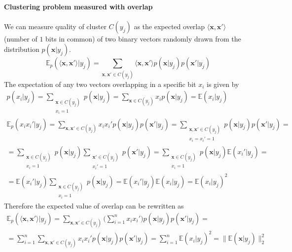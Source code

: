 \documentclass[12pt]{article}
\begin{document}
\paragraph{Clustering problem measured with overlap}
We can measure quality of cluster $C(y_j)$ as the expected overlap $\langle \boldsymbol{x}, \boldsymbol{x}'\rangle$ (number of $1$ bits in common) of two binary vectors  randomly drawn from the distribution $p(\boldsymbol{x}|y_j)$.
\[
\mathbb{E}_p(\langle \boldsymbol{x}, \boldsymbol{x}'\rangle|y_j) = \sum_{\boldsymbol{x},\boldsymbol{x}'\in C(y_j)} \langle \boldsymbol{x}, \boldsymbol{x}'\rangle p(\boldsymbol{x}|y_j)p(\boldsymbol{x}'|y_j)
\]
The expectation of any two vectors overlapping in a specific bit $x_i$ is given by
\begin{gather*}
p(x_i|y_j) = \sum_{\substack{\boldsymbol{x}\in C(y_j)\\x_i=1}} p(\boldsymbol{x}|y_j)	= \sum_{\boldsymbol{x}\in C(y_j)} x_i p(\boldsymbol{x}|y_j)	= \mathbb{E}(x_i|y_j)\\
\mathbb{E}_p(x_i x_i' | y_j) = \sum_{\boldsymbol{x},\boldsymbol{x}'\in C(y_j)}  x_i x_i' p(\boldsymbol{x}|y_j)p(\boldsymbol{x}'|y_j) = 	\sum_{\substack{\boldsymbol{x},\boldsymbol{x}'\in C(y_j) \\ x_i=x_i'=1}} p(\boldsymbol{x}|y_j)p(\boldsymbol{x}'|y_j) = \\
= \sum_{\substack{\boldsymbol{x}\in C(y_j) \\ x_i=1}} p(\boldsymbol{x}|y_j) \sum_{\substack{\boldsymbol{x}'\in C(y_j) \\ x_i'=1}} p(\boldsymbol{x}'|y_j) = 
\sum_{\substack{\boldsymbol{x}\in C(y_j) \\ x_i=1}} p(\boldsymbol{x}|y_j) \mathbb{E}(x_i'|y_j)= \\
= \mathbb{E}(x_i'|y_j) \sum_{\substack{\boldsymbol{x}\in C(y_j) \\ x_i=1}} p(\boldsymbol{x}|y_j) = \mathbb{E}(x_i'|y_j) \mathbb{E}(x_i|y_j) = \mathbb{E}(x_i|y_j)^2
\end{gather*}
Therefore the expected value of overlap can be rewritten as  
\begin{gather*}
\mathbb{E}_p(\langle \boldsymbol{x}, \boldsymbol{x}'\rangle|y_j) =  \sum_{\boldsymbol{x},\boldsymbol{x}'\in C(y_j)} \big(\sum_{i=1}^n x_i x_i'\big)  p(\boldsymbol{x}|y_j)p(\boldsymbol{x}'|y_j) = \\
= \sum_{i=1}^n \sum_{\boldsymbol{x},\boldsymbol{x}'\in C(y_j)}  x_i x_i'  p(\boldsymbol{x}|y_j)p(\boldsymbol{x}'|y_j) = \sum_{i=1}^n \mathbb{E}(x_i|y_j)^2 = \lVert \mathbb{E}(\boldsymbol{x}|y_j) \rVert_2^2
\end{gather*}
\end{document}
